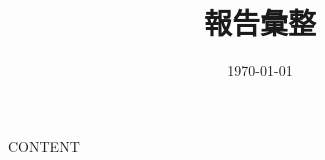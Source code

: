 \documentclass[twocolumn]{article}
\title{報告彙整}
\date{\today}
\begin{document}
\maketitle

{{CONTENT}}
\end{document}
